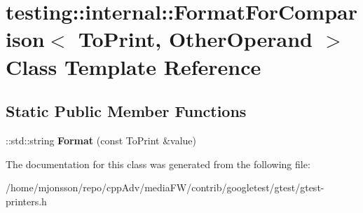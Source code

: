 \hypertarget{classtesting_1_1internal_1_1FormatForComparison}{}\section{testing\+:\+:internal\+:\+:Format\+For\+Comparison$<$ To\+Print, Other\+Operand $>$ Class Template Reference}
\label{classtesting_1_1internal_1_1FormatForComparison}
\subsection*{Static Public Member Functions}
\begin{DoxyCompactItemize}
\item 
\mbox{\label{classtesting_1_1internal_1_1FormatForComparison_a2aeb688fc55b57abd3021d82eccad896}} 
\+::std\+::string {\bfseries Format} (const To\+Print \&value)
\end{DoxyCompactItemize}


The documentation for this class was generated from the following file\+:\begin{DoxyCompactItemize}
\item 
/home/mjonsson/repo/cpp\+Adv/media\+F\+W/contrib/googletest/gtest/gtest-\/printers.\+h\end{DoxyCompactItemize}
